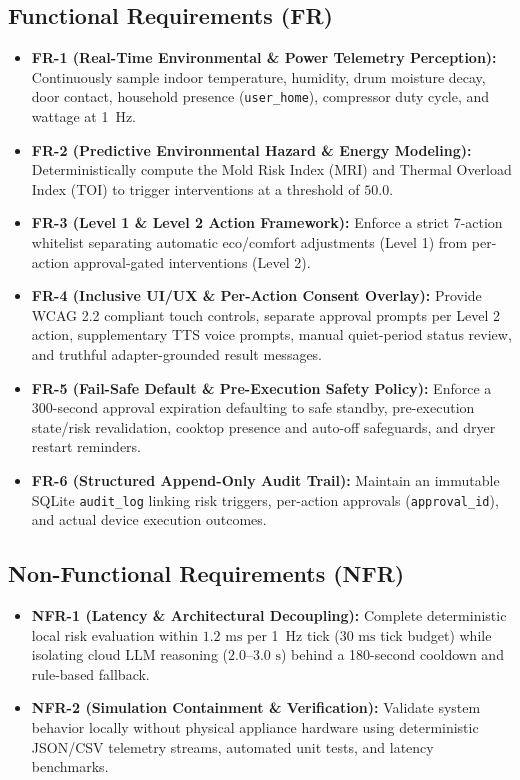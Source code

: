 \documentclass[conference]{IEEEtran}
\begin{document}
\subsection{Functional Requirements (FR)}
\begin{itemize}
    \item \textbf{FR-1 (Real-Time Environmental \& Power Telemetry Perception):} Continuously sample indoor temperature, humidity, drum moisture decay, door contact, household presence (\texttt{user\_home}), compressor duty cycle, and wattage at 1~Hz.
    \item \textbf{FR-2 (Predictive Environmental Hazard \& Energy Modeling):} Deterministically compute the Mold Risk Index (MRI) and Thermal Overload Index (TOI) to trigger interventions at a threshold of $50.0$.
    \item \textbf{FR-3 (Level 1 \& Level 2 Action Framework):} Enforce a strict 7-action whitelist separating automatic eco/comfort adjustments (Level 1) from per-action approval-gated interventions (Level 2).
    \item \textbf{FR-4 (Inclusive UI/UX \& Per-Action Consent Overlay):} Provide WCAG 2.2 compliant touch controls, separate approval prompts per Level 2 action, supplementary TTS voice prompts, manual quiet-period status review, and truthful adapter-grounded result messages.
    \item \textbf{FR-5 (Fail-Safe Default \& Pre-Execution Safety Policy):} Enforce a 300-second approval expiration defaulting to safe standby, pre-execution state/risk revalidation, cooktop presence and auto-off safeguards, and dryer restart reminders.
    \item \textbf{FR-6 (Structured Append-Only Audit Trail):} Maintain an immutable SQLite \texttt{audit\_log} linking risk triggers, per-action approvals (\texttt{approval\_id}), and actual device execution outcomes.
\end{itemize}

\subsection{Non-Functional Requirements (NFR)}
\begin{itemize}
    \item \textbf{NFR-1 (Latency \& Architectural Decoupling):} Complete deterministic local risk evaluation within $1.2\text{ ms}$ per 1~Hz tick ($30\text{ ms}$ tick budget) while isolating cloud LLM reasoning ($2.0\text{--}3.0\text{ s}$) behind a 180-second cooldown and rule-based fallback.
    \item \textbf{NFR-2 (Simulation Containment \& Verification):} Validate system behavior locally without physical appliance hardware using deterministic JSON/CSV telemetry streams, automated unit tests, and latency benchmarks.
\end{itemize}
\end{document}
